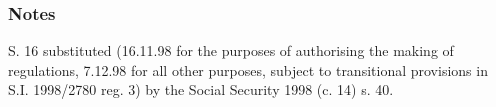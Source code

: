 \documentclass[a4paper]{article}
\newcommand\amendment[1]{\subsubsection*{Notes}{\itshape\frenchspacing\footnotesize #1 \par}}
\begin{document}
\amendment{

S. 16 substituted (16.11.98 for the purposes of authorising the making of regulations, 7.12.98 for all other purposes, subject to transitional provisions in S.I. 1998/2780 reg. 3) by the Social Security 1998 (c. 14) s. 40.  

%
%
%
%
%
%
%
%

}
\end{document}
